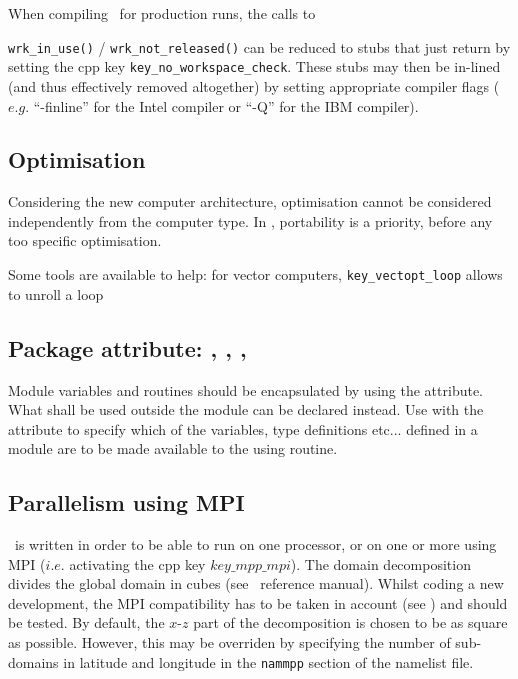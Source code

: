 When compiling \NEMO\ for production runs,
the calls to {\texttt{wrk\_in\_use()} / \texttt{wrk\_not\_released()} can be reduced to stubs that just
return  by setting the cpp key \texttt{key\_no\_workspace\_check}.
These stubs may then be in-lined (and thus effectively removed altogether) by setting appropriate compiler flags
($e.g.$ ``-finline'' for the Intel compiler or ``-Q'' for the IBM compiler).

\subsection{Optimisation}

Considering the new computer architecture, optimisation cannot be considered independently from the computer type.
In \NEMO, portability is a priority, before any too specific optimisation.

Some tools are available to help: for vector computers, \texttt{key\_vectopt\_loop} allows to unroll a loop

\subsection{Package attribute: , , , }

Module variables and routines should be encapsulated by using the  attribute.
What shall be used outside the module can be declared  instead.
Use  with the  attribute to specify which of the variables, type definitions etc...
defined in a module are to be made available to the using routine.

\subsection{Parallelism using MPI}

\NEMO\ is written in order to be able to run on one processor, or on one or more using MPI
($i.e.$ activating the cpp key $key\_mpp\_mpi$).
The domain decomposition divides the global domain in cubes (see \NEMO\ reference manual).
Whilst coding a new development, the MPI compatibility has to be taken in account
(see ) and should be tested.
By default, the $x$-$z$ part of the decomposition is chosen to be as square as possible.
However, this may be overriden by specifying the number of sub-domains in latitude and longitude in
the \texttt{nammpp} section of the namelist file.

}
